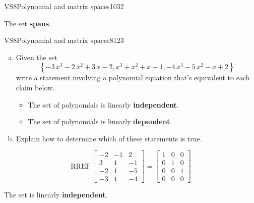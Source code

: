 \begin{exercise}{VS8}{Polynomial and matrix spaces}{1032}
\begin{exerciseAnswer}
 

 The set \textbf{spans}. 

 \end{exerciseAnswer}
 \end{exercise}


\begin{exercise}{VS8}{Polynomial and matrix spaces}{8123} 
\begin{exerciseStatement} 

\begin{enumerate}[(a)]
\item  

 Given the set \[\left\{ -3 \, x^{3} - 2 \, x^{2} + 3 \, x - 2 , x^{3} + x^{2} + x - 1 , -4 \, x^{3} - 5 \, x^{2} - x + 2 \right\}\] write a statement involving a polynomial equation that's equivalent to each claim below. 

 

\begin{itemize}
\item  

 The set of polynomials is linearly \textbf{independent}. 

 
\item  

 The set of polynomials is linearly \textbf{dependent}. 

 
\end{itemize}

     
\item  

 Explain how to determine which of these statements is true. 

 
\end{enumerate}

     \end{exerciseStatement}
 \begin{exerciseAnswer} 

 \[
\mathrm{RREF}\, \left[\begin{array}{ccc}
-2 & -1 & 2 \\
3 & 1 & -1 \\
-2 & 1 & -5 \\
-3 & 1 & -4
\end{array}\right] = \left[\begin{array}{ccc}
1 & 0 & 0 \\
0 & 1 & 0 \\
0 & 0 & 1 \\
0 & 0 & 0
\end{array}\right]
            \] 

 

 The set is linearly \textbf{independent}. 

 \end{exerciseAnswer}
 \end{exercise}


